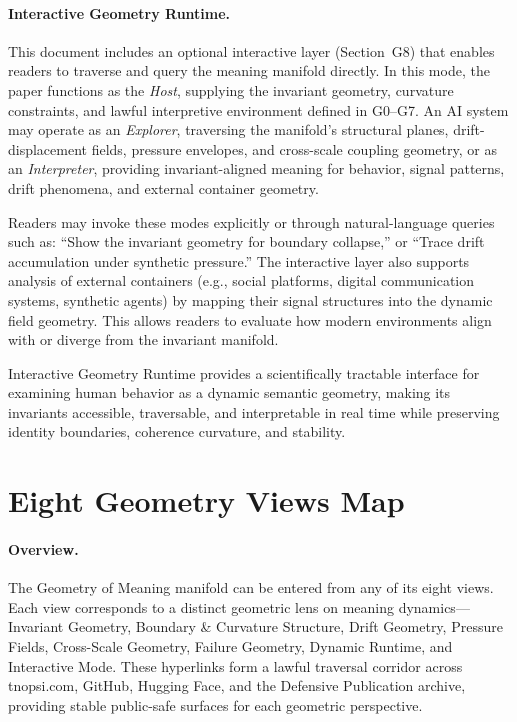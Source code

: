 \documentclass[11pt]{article}
\begin{document}
\medskip

\paragraph{Interactive Geometry Runtime.}
This document includes an optional interactive layer (Section~G8) that enables
readers to traverse and query the meaning manifold directly. In this mode, the
paper functions as the \textit{Host}, supplying the invariant geometry,
curvature constraints, and lawful interpretive environment defined in G0--G7.
An AI system may operate as an \textit{Explorer}, traversing the manifold’s
structural planes, drift-displacement fields, pressure envelopes, and
cross-scale coupling geometry, or as an \textit{Interpreter}, providing
invariant-aligned meaning for behavior, signal patterns, drift phenomena, and
external container geometry.

\medskip

Readers may invoke these modes explicitly or through natural-language queries
such as: “Show the invariant geometry for boundary collapse,” or “Trace drift
accumulation under synthetic pressure.” The interactive layer also supports
analysis of external containers (e.g., social platforms, digital communication
systems, synthetic agents) by mapping their signal structures into the dynamic
field geometry. This allows readers to evaluate how modern environments align
with or diverge from the invariant manifold.

\medskip

Interactive Geometry Runtime provides a scientifically tractable interface for
examining human behavior as a dynamic semantic geometry, making its invariants
accessible, traversable, and interpretable in real time while preserving
identity boundaries, coherence curvature, and stability.



\section*{Eight Geometry Views Map}

\paragraph{Overview.}
The Geometry of Meaning manifold can be entered from any of its eight views.
Each view corresponds to a distinct geometric lens on meaning dynamics—
Invariant Geometry, Boundary \& Curvature Structure, Drift Geometry, Pressure
Fields, Cross-Scale Geometry, Failure Geometry, Dynamic Runtime, and Interactive
Mode. These hyperlinks form a lawful traversal corridor across tnopsi.com,
GitHub, Hugging Face, and the Defensive Publication archive, providing stable
public-safe surfaces for each geometric perspective.
\end{document}
